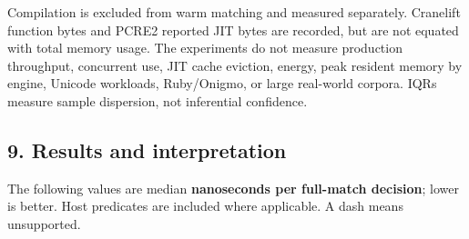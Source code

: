 \documentclass[
  11pt,
]{article}
\begin{document}
Compilation is excluded from warm matching and measured separately.
Cranelift function bytes and PCRE2 reported JIT bytes are recorded, but
are not equated with total memory usage. The experiments do not measure
production throughput, concurrent use, JIT cache eviction, energy, peak
resident memory by engine, Unicode workloads, Ruby/Onigmo, or large
real-world corpora. IQRs measure sample dispersion, not inferential
confidence.

\hypertarget{results-and-interpretation}{%
\subsection{9. Results and
interpretation}\label{results-and-interpretation}}

The following values are median \textbf{nanoseconds per full-match
decision}; lower is better. Host predicates are included where
applicable. A dash means unsupported.
\end{document}
